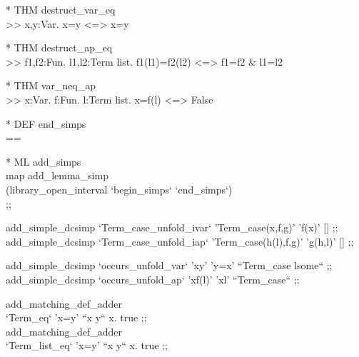 \begin{prl*}
\>* THM destruct\_var\_eq\\
\>  >> \mforall{}x,y:Var. x=y <=> x=y
\end{prl*}

\begin{prl*}
\>* THM destruct\_ap\_eq\\
\>  >> \mforall{}f1,f2:Fun. \mforall{}l1,l2:Term list. f1(l1)=f2(l2) <=> f1=f2 \& l1=l2
\end{prl*}

\begin{prl*}
\>* THM var\_neq\_ap\\
\>  >> \mforall{}x:Var. \mforall{}f:Fun. \mforall{}l:Term list. x=f(l) <=> False
\end{prl*}

\begin{prl*}
\>* DEF end\_simps\\
\>  ==
\end{prl*}

\begin{prl*}
\>* ML add\_simps\\
\>  map add\_lemma\_simp \\
\>      (library\_open\_interval `begin\_simps` `end\_simps`)\\
\>  ;;
\end{prl*}

\begin{prl*}
\>  add\_simple\_dcsimp `Term\_case\_unfold\_ivar` 'Term\_case(x,f,g)' 'f(x)' [] ;;\\
\>  add\_simple\_dcsimp `Term\_case\_unfold\_iap` 'Term\_case(h(l),f,g)' 'g(h,l)' [] ;;
\end{prl*}

\begin{prl*}
\>  add\_simple\_dcsimp `occurs\_unfold\_var` 'x\mepsilon{}y' 'y=x' ``Term\_case lsome`` ;;\\
\>  add\_simple\_dcsimp `occurs\_unfold\_ap` 'x\mepsilon{}f(l)' 'x\mepsilon{}l' ``Term\_case`` ;;
\end{prl*}

\begin{prl*}
\>  add\_matching\_def\_adder \\
\>    `Term\_eq` 'x=y' ``x y`` \mlambda{}x. true ;;\\
\>  add\_matching\_def\_adder \\
\>    `Term\_list\_eq` 'x=y' ``x y`` \mlambda{}x. true ;;
\end{prl*}

